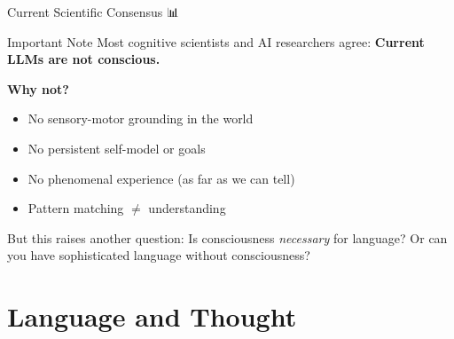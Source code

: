 \documentclass[aspectratio=169]{beamer}
\begin{document}
\begin{frame}[shrink=15]{Current Scientific Consensus 📊}
\small
\begin{alertblock}{Important Note}
Most cognitive scientists and AI researchers agree: \textbf{Current LLMs are not conscious.}
\end{alertblock}

\vspace{0.3cm}

\textbf{Why not?}
\begin{itemize}\setlength{\itemsep}{0pt}\setlength{\itemsep}{0pt}
    \item No sensory-motor grounding in the world
    \item No persistent self-model or goals
    \item No phenomenal experience (as far as we can tell)
    \item Pattern matching $\neq$ understanding
\end{itemize}

\vspace{0.3cm}

\begin{thinkaboutit}
But this raises another question: Is consciousness \textit{necessary} for language? Or can you have sophisticated language without consciousness?
\end{thinkaboutit}
\end{frame}

\section{Language and Thought}
\end{document}
